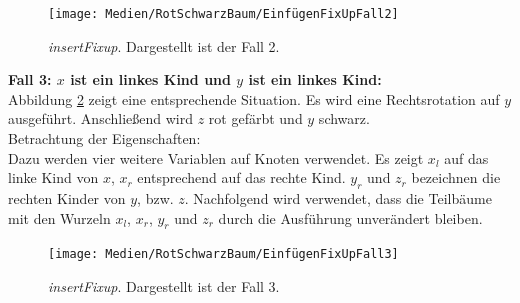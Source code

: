 \documentclass[a4paper,12pt]{article}
\begin{document}
\begin{figure}[H]
	\centering
	\texttt{[image: Medien/RotSchwarzBaum/EinfügenFixUpFall2]}
	\caption{\textit{insertFixup}. Dargestellt ist der Fall 2.  }
	\label{fig:EinfügenFixUpFall2}
\end{figure}

\noindent\textbf{Fall 3: $x$ ist ein linkes Kind und $y$ ist ein linkes Kind: }\\
\noindent Abbildung \ref{fig:EinfügenFixUpFall3} zeigt eine entsprechende Situation. Es wird eine Rechtsrotation auf $y$ ausgeführt. Anschließend wird $z$ rot gefärbt und $y$ schwarz. \\

\noindent Betrachtung der Eigenschaften:\\
\noindent Dazu werden vier weitere Variablen auf Knoten verwendet. Es zeigt $x_l$ auf das linke Kind von $x$,  $x_r$ entsprechend auf das rechte Kind. $y_r$ und $z_r$ bezeichnen die rechten Kinder von $y$, bzw. $z$. Nachfolgend wird verwendet, dass die Teilbäume mit den Wurzeln $x_l$, $x_r$, $y_r$ und $z_r$ durch die Ausführung unverändert bleiben.
\begin{figure}[H]
	\centering
	\texttt{[image: Medien/RotSchwarzBaum/EinfügenFixUpFall3]}
	\caption{\textit{insertFixup}. Dargestellt ist der Fall 3.  }
	\label{fig:EinfügenFixUpFall3}
\end{figure}
\end{document}
